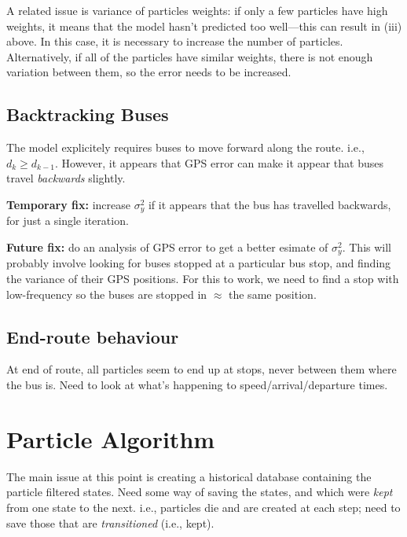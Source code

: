 \documentclass[10pt,a4paper]{article}
\begin{document}
A related issue is variance of particles weights: if only a few particles have high weights, it means that 
the model hasn't predicted too well---this can result in (iii) above. 
In this case, it is necessary to increase the number of particles.
Alternatively, if all of the particles have similar weights, there is not enough variation between them,
so the error needs to be increased.


\subsection{Backtracking Buses}

The model explicitely requires buses to move forward along the route. 
i.e., $d_k \geq d_{k-1}$.
However, it appears that GPS error can make it appear that buses travel \emph{backwards} slightly.

\textbf{Temporary fix:} increase $\sigma_y^2$ if it appears that the bus has travelled backwards, 
for just a single iteration.

\textbf{Future fix:} do an analysis of GPS error to get a better esimate of $\sigma_y^2$.
This will probably involve looking for buses stopped at a particular bus stop, 
and finding the variance of their GPS positions.
For this to work, we need to find a stop with low-frequency so the buses are stopped in $\approx$ the same position.



\subsection{End-route behaviour}

At end of route, all particles seem to end up at stops, never between them where the bus is.
Need to look at what's happening to speed/arrival/departure times.





\section{Particle Algorithm}
\label{sec:particle_algorithm}


The main issue at this point is creating a historical database 
containing the particle filtered states.
Need some way of saving the states, and which were \emph{kept}
from one state to the next.
i.e., particles die and are created at each step;
need to save those that are \emph{transitioned} (i.e., kept).
\end{document}
